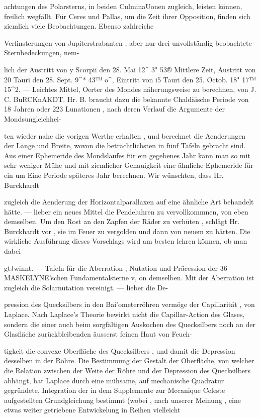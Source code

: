 \documentclass[10pt,a4paper]{article}
\begin{document}
achtungen des Polarsterns, in beiden CulminaUonen zugleich, leisten können, freilich wegfällt. Für Ceres und Pallas, um die Zeit ihrer Opposition, finden sich ziemlich viele Beobachtungen. Ebenso zahlreiche

Verfinsterungen von Jupiterstrabanten , aber nur drei unvollständig beobachtete Sternbedeckungen, nem-

lich der Austritt von y Scorpii den 28. Mai 12\textasciicircum{} 3" 53® Mittlere Zeit, Austritt von 20 Tauri den 28. Sept. 9\textasciicircum{}* 43™ o\textasciicircum{}, Eintritt von i5 Tauri den 25. Octob. 18" 17™ 15\textasciicircum{}2. — Leichtes Mittel, Oerter des Mondes näherungsweise zu berechnen, von J. C. BuRCKnAKDT. Hr. B. braucht dazu die bekannte Chaldäische Periode von 18 Jahren oder 223 Lunationen , nach deren Verlauf die Argumente der Mondsungleichhei-

ten wieder nahe die vorigen Werthe erhalten , und berechnet die Aenderungen der Länge und Breite, wovon die beträchtlichsten in fünf Tafeln gebracht sind. Aus einer Ephemeride des Mondslaufes für ein gegebenes Jahr kann man so mit sehr weniger Mühe und mit ziemlicher Genauigkeit eine ähnliche Ephemeride für ein um Eine Periode späteres Jahr berechnen. Wir wünschten, dass Hr. Burckhardt

zugleich die Aenderung der Horizontalparallaxen auf eine ähnliche Art behandelt hätte. — lieber ein neues Mittel die Pendeluhren zu vervollkommnen, von eben demselben. Um den Rost an den Zapfen der Räder zu verhüten , schlägt Hr. Burckhardt vor , sie im Feuer zu vergolden und dann von neuem zu härten. Die wirkliche Ausführung dieses Vorschlags wird am besten lehren können, ob man dabei

gtJwinnt. — Tafeln für die Aberration , Nutation und Präcession der 36 MASKELYNE'schen Fundamentalsterne v, on demselben. Mit der Aberration ist zugleich die Solarnutation vereinigt. — lieber die De-

pression des Quecksilbers in den Bai'ometerröhren vermöge der Capillarität , von Laplace. Nach Laplace's Theorie bewirkt nicht die Capillar-Action des Glases, sondern die einer auch beim sorgfältigen Auskochen des Quecksilbers noch an der Glasfläche zurückbleibenden äusserst feinen Haut von Feuch-

tigkeit die convexe Oberfläche des Quecksilbers , und damit die Depression desselben in der Röhre. Die Bestimmung der Gestalt der Oberfläche, von welcher die Relation zwischen der Weite der Röhre und der Depression des Quecksilbers abhängt, hat Laplace durch eine mühsame, auf mechanische Quadratur gegründete, Integration der in dem Supplemente zur Mecanique Celeste aufgestellten Grundgleichung bestimmt (wobei , nach unserer Meinung , eine etwas weiter getriebene Entwickelung in Reihen vielleicht
\end{document}
